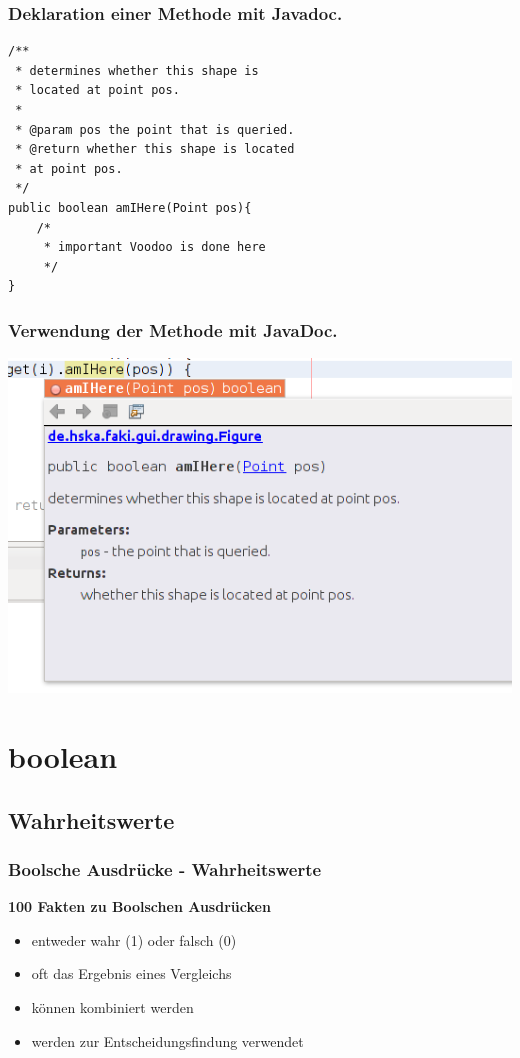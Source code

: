 \documentclass[final]{beamer}
\begin{document}
\begin{frame}[containsverbatim]
	\frametitle{Deklaration einer Methode mit Javadoc.}
	\begin{lstlisting}
/**
 * determines whether this shape is
 * located at point pos.
 *
 * @param pos the point that is queried.
 * @return whether this shape is located
 * at point pos.
 */
public boolean amIHere(Point pos){
	/*
	 * important Voodoo is done here
	 */
}
	\end{lstlisting}
\end{frame}

\begin{frame}
	\frametitle{Verwendung der Methode mit JavaDoc.}
	\includegraphics[scale=0.5]{JavaDoc_example_2_1.png}
\end{frame}

\section{boolean}
\subsection{Wahrheitswerte}
\begin{frame}
	\frametitle{Boolsche Ausdrücke - Wahrheitswerte}
	\textbf{100 Fakten zu Boolschen Ausdrücken}
	\begin{itemize}
		\item{entweder wahr (1) oder falsch (0)}
		\item{oft das Ergebnis eines Vergleichs}
		\item{können kombiniert werden}
		\item{werden zur Entscheidungsfindung verwendet}
	\end{itemize}
\end{frame}
\end{document}
